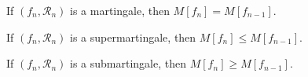 If $(f_n, \mathcal{R}_n)$ is a martingale, then $M[f_n] = M[f_{n-1}]$.

If $(f_n, \mathcal{R}_n)$ is a supermartingale, then $M[f_n] \leq M[f_{n-1}]$.

If $(f_n, \mathcal{R}_n)$ is a submartingale, then $M[f_n] \geq M[f_{n-1}]$.
